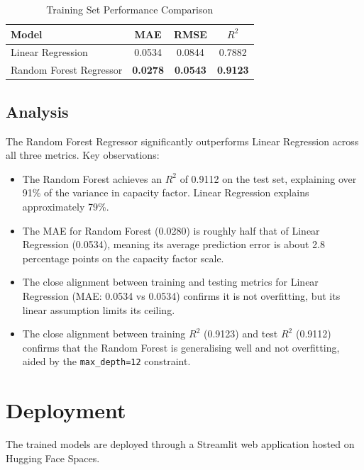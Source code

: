 \documentclass[12pt, a4paper]{article}
\begin{document}
\begin{table}[H]
    \centering
    \caption{Training Set Performance Comparison}
    \begin{tabular}{lccc}
        \toprule
        \textbf{Model} & \textbf{MAE} & \textbf{RMSE} & \textbf{$R^2$} \\
        \midrule
        Linear Regression & 0.0534 & 0.0844 & 0.7882 \\
        \rowcolor{solarblue!8} Random Forest Regressor & \textbf{0.0278} & \textbf{0.0543} & \textbf{0.9123} \\
        \bottomrule
    \end{tabular}
\end{table}

\subsection{Analysis}

The Random Forest Regressor significantly outperforms Linear Regression across all three metrics. Key observations:

\begin{itemize}[noitemsep]
    \item The Random Forest achieves an $R^2$ of 0.9112 on the test set, explaining over 91\% of the variance in capacity factor. Linear Regression explains approximately 79\%.
    \item The MAE for Random Forest (0.0280) is roughly half that of Linear Regression (0.0534), meaning its average prediction error is about 2.8 percentage points on the capacity factor scale.
    \item The close alignment between training and testing metrics for Linear Regression (MAE: 0.0534 vs 0.0534) confirms it is not overfitting, but its linear assumption limits its ceiling.
    \item The close alignment between training $R^2$ (0.9123) and test $R^2$ (0.9112) confirms that the Random Forest is generalising well and not overfitting, aided by the \texttt{max\_depth=12} constraint.
\end{itemize}

\newpage
\section{Deployment}

The trained models are deployed through a Streamlit web application hosted on Hugging Face Spaces.
\end{document}
